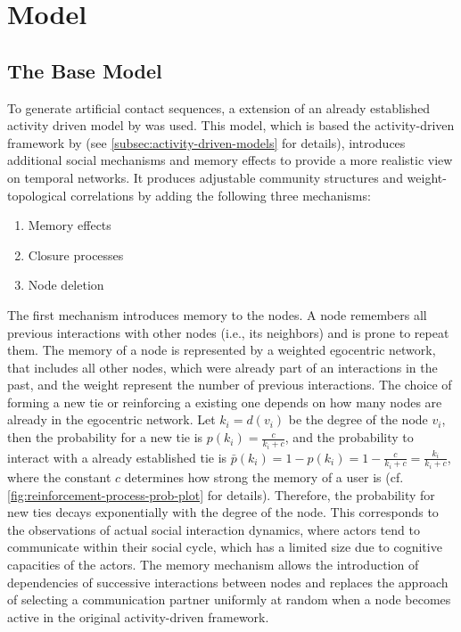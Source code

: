 \chapter{Model}


\section{The Base Model}



To generate artificial contact sequences, a extension of an already established activity driven model by \citet{Laurent2015} was used.
This model, which is based the activity-driven framework by \citet{Perra2012a} (see \autoref{subsec:activity-driven-models} for details), introduces additional social mechanisms and memory effects to provide a more realistic view on temporal networks.
It produces adjustable community structures and weight-topological correlations by adding the following three mechanisms:

\begin{enumerate}
    \item Memory effects
    \item Closure processes
    \item Node deletion
\end{enumerate}

The first mechanism introduces memory to the nodes. 
A node remembers all previous interactions with other nodes (i.e., its neighbors) and is prone to repeat them.
The memory of a node is represented by a weighted egocentric network, that includes all other nodes, which were already part of an interactions in the past, and the weight represent the number of previous interactions.
The choice of forming a new tie or reinforcing a existing one depends on how many nodes are already in the egocentric network.
Let \(k_{i} = d(v_{i})\) be the degree of the node \(v_{i}\), then the probability for a new tie is \(p(k_{i}) = \frac{c}{k_{i} + c}\), and the probability to interact with a already established tie is \(\bar{p}(k_{i}) = 1 - p(k_{i}) = 1 - \frac{c}{k_{i} + c} = \frac{k_{i}}{k_{i} + c}\), where the constant \(c\) determines how strong the memory of a user is (cf.  \autoref{fig:reinforcement-process-prob-plot} for details).
Therefore, the probability for new ties decays exponentially with the degree of the node.
This corresponds to the observations of actual social interaction dynamics, where actors tend to communicate within their social cycle, which has a limited size due to cognitive capacities of the actors.
The memory mechanism allows the introduction of dependencies of successive interactions between nodes and replaces the approach of selecting a communication partner uniformly at random when a node becomes active in the original activity-driven framework.

